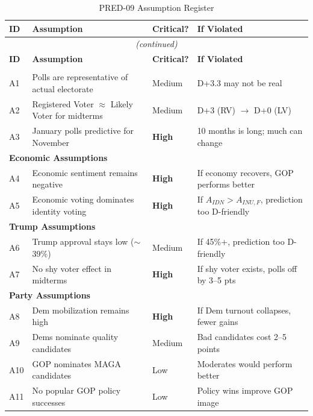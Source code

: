 \begin{longtable}{p{1.2cm}p{5.5cm}p{2cm}p{4.5cm}}
\caption{PRED-09 Assumption Register} \\
\toprule
\textbf{ID} & \textbf{Assumption} & \textbf{Critical?} & \textbf{If Violated} \\
\midrule
\endfirsthead
\multicolumn{4}{c}{\textit{(continued)}} \\
\toprule
\textbf{ID} & \textbf{Assumption} & \textbf{Critical?} & \textbf{If Violated} \\
\midrule
\endhead
\bottomrule
\endfoot

\multicolumn{4}{l}{\textbf{Polling Assumptions}} \\
\midrule
A1 & Polls are representative of actual electorate & Medium & D+3.3 may not be real \\
A2 & Registered Voter $\approx$ Likely Voter for midterms & Medium & D+3 (RV) $\to$ D+0 (LV) \\
A3 & January polls predictive for November & \textbf{High} & 10 months is long; much can change \\
\midrule

\multicolumn{4}{l}{\textbf{Economic Assumptions}} \\
\midrule
A4 & Economic sentiment remains negative & \textbf{High} & If economy recovers, GOP performs better \\
A5 & Economic voting dominates identity voting & \textbf{High} & If $A_{IDN} > A_{INU,F}$, prediction too D-friendly \\
\midrule

\multicolumn{4}{l}{\textbf{Trump Assumptions}} \\
\midrule
A6 & Trump approval stays low ($\sim$39\%) & Medium & If 45\%+, prediction too D-friendly \\
A7 & No shy voter effect in midterms & \textbf{High} & If shy voter exists, polls off by 3--5 pts \\
\midrule

\multicolumn{4}{l}{\textbf{Party Assumptions}} \\
\midrule
A8 & Dem mobilization remains high & \textbf{High} & If Dem turnout collapses, fewer gains \\
A9 & Dems nominate quality candidates & Medium & Bad candidates cost 2--5 points \\
A10 & GOP nominates MAGA candidates & Low & Moderates would perform better \\
A11 & No popular GOP policy successes & Low & Policy wins improve GOP image \\
\midrule


\end{longtable}

